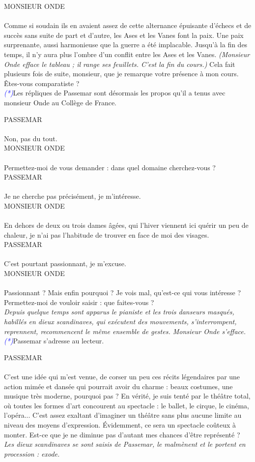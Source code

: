 \documentclass[a4paper]{report}
\newcounter{rem}[chapter]
\newcounter{exo}[chapter]
\newcommand{\annot}[1]{{\footnotesize \textcolor{blue}{\textit{(#1)}}}}
\newcommand{\repl}[2]{\uppercase{#1}\\\\#2\\}
\newcommand{\didas}[1]{\textit{#1}\\}
\begin{document}
\repl{Monsieur Onde}{Comme si soudain ils en avaient assez de cette alternance épuisante d'échecs et de succès sans suite de part et d'autre, les Ases et les Vanes font la paix. Une paix surprenante, aussi harmonieuse que la guerre a été implacable. Jusqu'à la fin des temps, il n'y aura plus l'ombre d'un conflit entre les Ases et les Vanes. \textit{(Monsieur Onde efface le tableau ; il range ses feuillets. C'est la fin du cours.)} Cela fait plusieurs fois de suite, monsieur, que je remarque votre présence à mon cours. Êtes-vous comparatiste ?}

\annot*{Les répliques de Passemar sont désormais les propos qu'il a tenus avec monsieur Onde au Collège de France.}

\repl{Passemar}{Non, pas du tout.}

\repl{Monsieur Onde}{Permettez-moi de vous demander : dans quel domaine cherchez-vous ?}

\repl{Passemar}{Je ne cherche pas précisément, je m'intéresse.}

\repl{Monsieur Onde}{En dehors de deux ou trois dames âgées, qui l'hiver viennent ici quérir un peu de chaleur, je n'ai pas l'habitude de trouver en face de moi des visages.}

\repl{Passemar}{C'est pourtant passionnant, je m'excuse.}

\repl{Monsieur Onde}{Passionnant ? Mais enfin pourquoi ? Je vois mal, qu'est-ce qui vous intéresse ? Permettez-moi de vouloir saisir : que faites-vous ?}

\didas{Depuis quelque temps sont apparus le pianiste et les trois danseurs masqués, habillés en dieux scandinaves, qui exécutent des mouvements, s'interrompent, reprennent, recommencent le même ensemble de gestes. Monsieur Onde s'efface.}

\annot*{Passemar s'adresse au lecteur.}

\repl{Passemar}{C'est une idée qui m'est venue, de corser un peu ces récits légendaires par une action mimée et dansée qui pourrait avoir du charme : beaux costumes, une musique très moderne, pourquoi pas ? En vérité, je suis tenté par le théâtre total, où toutes les formes d'art concourent au spectacle : le ballet, le cirque, le cinéma, l'opéra... C'est assez exaltant d'imaginer un théâtre sans plus aucune limite au niveau des moyens d'expression. Évidemment, ce sera un spectacle coûteux à monter. Est-ce que je ne diminue pas d'autant mes chances d'être représenté ?}

\didas{Les dieux scandinaves se sont saisis de Passemar, le malmènent et le portent en procession : exode.}
\end{document}
